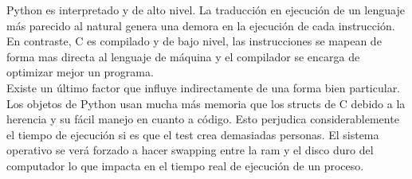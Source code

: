 \documentclass[letter]{article}
\begin{document}
\begin{parte}{3}
		Python es interpretado y de alto nivel. La traducción en ejecución de un lenguaje más parecido al natural genera una demora en la ejecución de cada instrucción. En contraste, C es compilado y de bajo nivel, las instrucciones se mapean de forma mas directa al lenguaje de máquina y el compilador se encarga de optimizar mejor un programa.\\
		
		Existe un último factor que influye indirectamente de una forma bien particular. Los objetos de Python usan mucha más memoria que los structs de C debido a la herencia y su fácil manejo en cuanto a código. Esto perjudica considerablemente el tiempo de ejecución si es que el test crea demasiadas personas. El sistema operativo se verá forzado a hacer swapping entre la ram y el disco duro del computador lo que impacta en el tiempo real de ejecución de un proceso.\\
		
	\end{parte}
		
\end{document}
